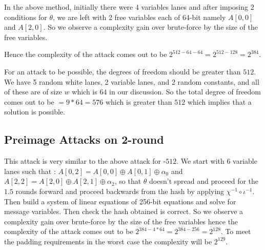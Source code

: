         In the above method, initially there were 4 variables lanes and after imposing 2 conditions for $\theta$, we are left with 2 free variables each of 64-bit namely $A[0,0]$ and $A[2, 0]$. So we observe a complexity gain over brute-force by the size of the free variables.
        
        Hence the complexity of the attack comes out to be $2^{512 - 64 - 64} = 2^{512 - 128} = 2^{384}$.

        For an attack to be possible, the degrees of freedom should be greater than $512$. We have 5 random white lanes, 2 variable lanes, and 2 random constants, and all of these are of size $w$ which is $64$ in our discussion. So the total degree of freedom comes out to be $= 9 * 64 = 576$ which is greater than $512$ which implies that a solution is possible.

\subsection{Preimage Attacks on 2-round }
    This attack is very similar to the above attack for \KECCAK-$512$. We start with 6 variable lanes such that :
    $A[0, 2] = A[0, 0] \oplus A[0, 1] \oplus \alpha_0$ and $A[2, 2] = A[2, 0] \oplus A[2, 1] \oplus \alpha_2$, so that $\theta$ doesn't spread and proceed for the $1.5$ rounds forward and proceed backwards from the hash by applying $\chi^{-1} \circ \iota^{-1}$. Then build a system of linear equations of 256-bit equations and solve for message variables. Then check the hash obtained is correct. So we observe a complexity gain over brute-force by the size of the free variables hence the complexity of the attack comes out to be $2^{384 - 4*64} = 2^{384 - 256} = 2^{128}$. To meet the padding requirements in the worst case the complexity will be $2^{129}$.

